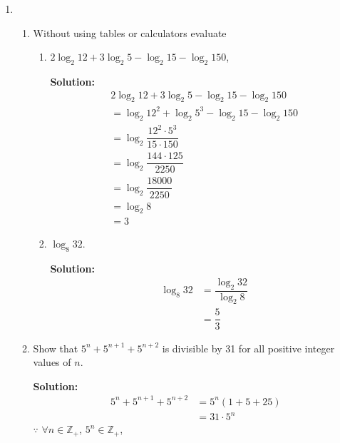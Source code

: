 \documentclass{report}
\newcommand{\sol}{\vspace{0.2cm}\textbf{Solution:}\vspace{0.2cm}}
\begin{document}
\begin{multicols*}{2}
\begin{enumerate}[leftmargin=*]
        \item \begin{enumerate}
                  \item Without using tables or calculators evaluate
                        \begin{enumerate}
                            \item $2 \log _2 12+3 \log _2 5-\log _2 15-\log _2 150$,

                                  \sol{}
                                  \begin{align*}
                                       & 2 \log_2 12 + 3 \log_2 5 - \log_2 15 - \log_2 150   & \\
                                       & = \log_2 12^2 + \log_2 5^3 - \log_2 15 - \log_2 150 & \\
                                       & = \log_2 \dfrac{12^2 \cdot 5^3}{15 \cdot 150}       & \\
                                       & = \log_2 \dfrac{144 \cdot 125}{2250}                & \\
                                       & = \log_2 \dfrac{18000}{2250}                        & \\
                                       & = \log_2 8                                          & \\
                                       & = 3
                                  \end{align*}

                            \item $\log _8 32$.

                                  \sol{}
                                  \begin{align*}
                                      \log_8 32 & = \dfrac{\log_2 32}{\log_2 8} \\
                                                & = \dfrac{5}{3}
                                  \end{align*}
                        \end{enumerate}

                  \item Show that $5^n+5^{n+1}+5^{n+2}$ is divisible by 31 for all positive integer
                        values of $n$.

                        \sol{}
                        \begin{align*}
                            5^n + 5^{n+1} + 5^{n+2} & = 5^n(1 + 5 + 25) \\
                                                    & = 31 \cdot 5^n
                        \end{align*}
                        $\because$ $\forall n \in \mathbb{Z}_+$, $5^n \in \mathbb{Z}_+$,


\end{enumerate}
\end{enumerate}
\end{multicols*}
\end{document}
